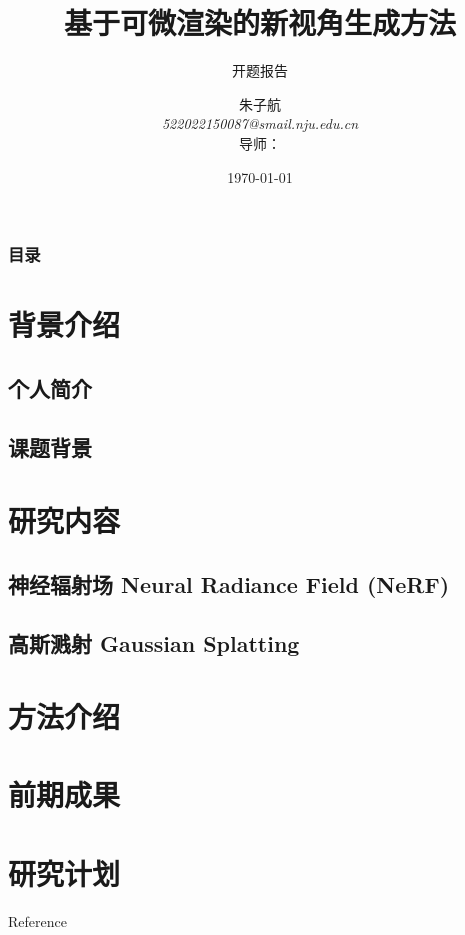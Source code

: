 \documentclass{njupre/njupre}
\title[基于可微渲染的新视角生成方法]{基于可微渲染的新视角生成方法}
\subtitle{ 开题报告 }
\author[朱子航]{\texorpdfstring{
    朱子航 \\ \smallskip 
    \textit{522022150087@smail.nju.edu.cn} \\ \smallskip
    导师：}{}
}
\date[\today]{\texorpdfstring{\today}{}}
\begin{document}
\begin{frame}
    \titlepage
\end{frame}
\begin{frame}
    \frametitle{目录}
    \tableofcontents
\end{frame}

\section{背景介绍}

\subsection{个人简介}



\subsection{课题背景}

\section{研究内容}
\subsection{神经辐射场 Neural Radiance Field (NeRF)}

\subsection{高斯溅射 Gaussian Splatting}


\section{方法介绍}

\section{前期成果}

\section{研究计划}


\begin{frame}[allowframebreaks]{Reference}
    
    
\end{frame}
\end{document}
